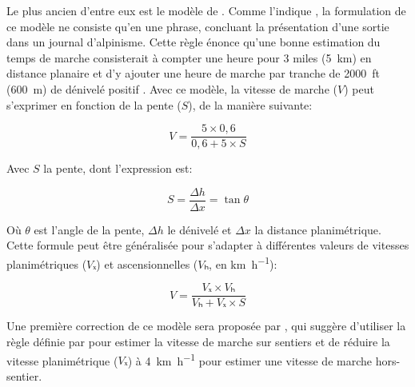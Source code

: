 Le plus ancien d'entre eux est le modèle de
\textcite{Naismith1892}. Comme l'indique \textcite{Duchene2019}, la
formulation de ce modèle ne consiste qu'en une phrase, concluant la
présentation d'une sortie dans un journal d'alpinisme. Cette règle
énonce qu'une bonne estimation du temps de marche consisterait à
compter une heure pour 3 miles (\SI{5}{\kilo\meter}) en distance
planaire et d'y ajouter une heure de marche par tranche de
\SI{2000}{ft} (\SI{600}{\meter}) de dénivelé positif
\autocite{Naismith1892}. Avec ce modèle, la vitesse de marche (\(V\))
peut s'exprimer en fonction de la pente (\(S\)), de la manière
suivante:

\begin{equation}
  \label{eq:marche_naismith}
  V = \dfrac{5 × 0,6}{0,6 + 5 × S}
\end{equation}

Avec \(S\) la pente, dont l'expression est:

\begin{equation}
 S = \dfrac{Δh}{Δx} = \tan θ
\end{equation}

Où \(θ\) est l'angle de la pente, \(Δh\) le dénivelé et \(Δx\) la
distance planimétrique. Cette formule peut être généralisée pour
s'adapter à différentes valeurs de vitesses planimétriques (\(Vₓ\)) et
ascensionnelles (\(Vₕ\), en \si{\kilo\meter\per\hour}):

\begin{equation}
  \label{eq:marche_naismith_f}
  V = \dfrac{Vₓ × Vₕ}{Vₕ + Vₓ × S}
\end{equation}

Une première correction de ce modèle sera proposée par
\textcite{Aitken1977}, qui suggère d'utiliser la règle définie par
\autocite{Naismith1892} pour estimer la vitesse de marche sur sentiers
et de réduire la vitesse planimétrique (\(Vₓ\)) à
\SI{4}{\kilo\meter\per\hour} pour estimer une vitesse de marche
hors-sentier.

